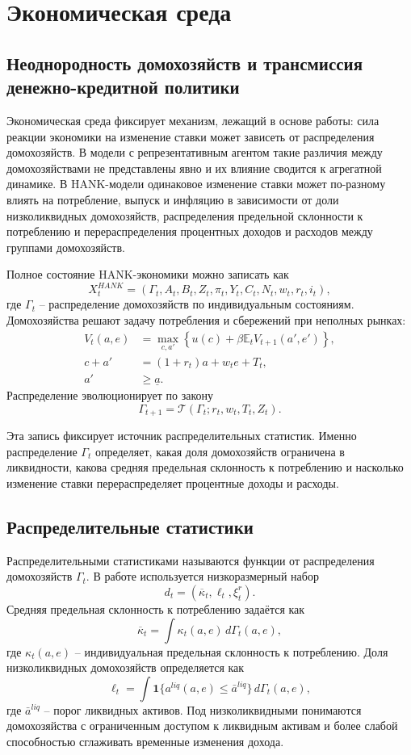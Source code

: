 \section{Экономическая среда}

\subsection{Неоднородность домохозяйств и трансмиссия денежно-кредитной политики}

Экономическая среда фиксирует механизм, лежащий в основе работы: сила реакции экономики на
изменение ставки может зависеть от распределения домохозяйств. В модели с репрезентативным
агентом такие различия между домохозяйствами не представлены явно и их влияние сводится к
агрегатной динамике. В HANK-модели одинаковое изменение ставки может по-разному влиять на
потребление, выпуск и инфляцию в зависимости от доли низколиквидных домохозяйств, распределения
предельной склонности к потреблению и перераспределения процентных доходов и расходов между
группами домохозяйств.

Полное состояние HANK-экономики можно записать как
\[
X_t^{HANK}
=
\left(
\Gamma_t,A_t,B_t,Z_t,\pi_t,Y_t,C_t,N_t,w_t,r_t,i_t
\right),
\]
где \(\Gamma_t\) -- распределение домохозяйств по индивидуальным состояниям. Домохозяйства решают
задачу потребления и сбережений при неполных рынках:
\[
\begin{aligned}
V_t(a,e)
&=
\max_{c,a'}
\left\{
u(c)+\beta \mathbb E_t V_{t+1}(a',e')
\right\},\\
c+a'&=(1+r_t)a+w_t e+T_t,\\
a'&\geq \underline a .
\end{aligned}
\]
Распределение эволюционирует по закону
\[
\Gamma_{t+1}
=
\mathcal T(\Gamma_t;r_t,w_t,T_t,Z_t).
\]

Эта запись фиксирует источник распределительных статистик. Именно распределение
\(\Gamma_t\) определяет, какая доля домохозяйств ограничена в ликвидности, какова средняя
предельная склонность к потреблению и насколько изменение ставки перераспределяет процентные
доходы и расходы.

\subsection{Распределительные статистики}

Распределительными статистиками называются функции от распределения домохозяйств
\(\Gamma_t\). В работе используется низкоразмерный набор
\[
d_t
=
\left(
\overline{\kappa}_t,\ell_t,\xi_t^r
\right).
\]
Средняя предельная склонность к потреблению задаётся как
\[
\overline{\kappa}_t
=
\int \kappa_t(a,e)\,d\Gamma_t(a,e),
\]
где \(\kappa_t(a,e)\) -- индивидуальная предельная склонность к потреблению. Доля
низколиквидных домохозяйств определяется как
\[
\ell_t
=
\int
\mathbf 1\{a^{liq}(a,e)\leq \bar a^{liq}\}\,d\Gamma_t(a,e),
\]
где \(\bar a^{liq}\) -- порог ликвидных активов. Под низколиквидными понимаются домохозяйства с
ограниченным доступом к ликвидным активам и более слабой способностью сглаживать временные
изменения дохода.

